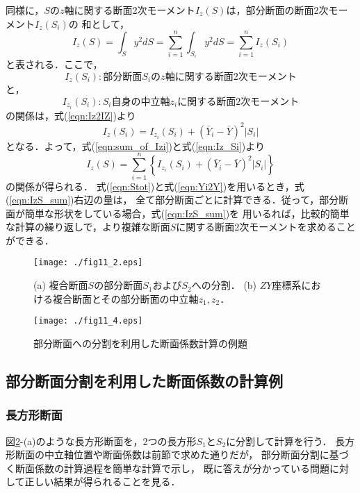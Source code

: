﻿\documentclass[10pt,a4j]{jbook}
\begin{document}
同様に，$S$の$z$軸に関する断面2次モーメント$I_z(S)$は，部分断面の断面2次モーメント$I_z(S_i)$の
和として，
\begin{equation}
	I_z(S)=\int_S y^2 dS=\sum_{i=1}^n\int_{S_i} y^2dS=\sum_{i=1}^n I_z(S_i)
	\label{eqn:sum_of_Izi}
\end{equation}
と表される．ここで，
\[
	I_z(S_i): 部分断面S_iのz軸に関する断面2次モーメント
\]
と，
\[
	I_{z_i}(S_i): S_i自身の中立軸z_iに関する断面2次モーメント
\]
の関係は，式(\ref{eqn:Iz2IZ})より
\begin{equation}
	I_z(S_i)=I_{z_i}(S_i)+\left( \bar Y_i-\bar{Y} \right)^2 \left|S_i\right|
	\label{eqn:Iz_Si}
\end{equation}
となる．よって，式(\ref{eqn:sum_of_Izi})と式(\ref{eqn:Iz_Si})より
\begin{equation}
	I_z(S)=
	\sum_{i=1}^n\left\{
		I_{z_i}(S_i)+\left( \bar Y_i-\bar{Y} \right)^2 \left|S_i\right|
	\right\}
	\label{eqn:IzS_sum}
\end{equation}
の関係が得られる．
式(\ref{eqn:Stot})と式(\ref{eqn:Yi2Y})を用いるとき，式(\ref{eqn:IzS_sum})右辺の量は，
全て部分断面ごとに計算できる．従って，部分断面が簡単な形状をしている場合，式(\ref{eqn:IzS_sum})を
用いるれば，比較的簡単な計算の繰り返しで，より複雑な断面$S$に関する断面2次モーメントを求めることができる．
\begin{figure}[h]
	\begin{center}
	\texttt{[image: ./fig11\_2.eps]} 
	\end{center}
	\caption{
		(a) 複合断面$S$の部分断面$S_1$および$S_2$への分割．
		(b) $ZY$座標系における複合断面とその部分断面の中立軸$z_1,z_2$．
	} 
	\label{fig:fig11_2}
\end{figure}
\begin{figure}[h]
	\begin{center}
	\texttt{[image: ./fig11\_4.eps]} 
	\end{center}
	\caption{
		部分断面への分割を利用した断面係数計算の例題
	} 
	\label{fig:fig11_4}
\end{figure}
\subsection{部分断面分割を利用した断面係数の計算例}
\subsubsection{長方形断面}
図\ref{fig:fig11_4}-(a)のような長方形断面を，2つの長方形$S_1$と$S_2$に分割して計算を行う．
長方形断面の中立軸位置や断面係数は前節で求めた通りだが，
部分断面分割に基づく断面係数の計算過程を簡単な計算で示し，
既に答えが分かっている問題に対して正しい結果が得られることを見る．
\end{document}
